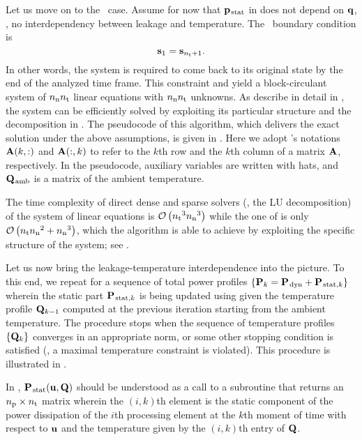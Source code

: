 Let us move on to the \DSS\ case.
Assume for now that $\mathbf{p}_{\text{\kern0.1emstat}}$ in  does not depend on $\mathbf{q}$, \ie, no interdependency between leakage and temperature.
The \DSS\ boundary condition is
\[
  \mathbf{s}_1 = \mathbf{s}_{{n_\text{t}} + 1}.
\]
In other words, the system is required to come back to its original state by the end of the analyzed time frame.
This constraint and  yield a block-circulant system of ${n_\text{n}} {n_\text{t}}$ linear equations with ${n_\text{n}} {n_\text{t}}$ unknowns.
As describe in detail in \cite{ukhov2012}, the system can be efficiently solved by exploiting its particular structure and the decomposition in .
The pseudocode of this algorithm, which delivers the exact solution under the above assumptions, is given in .
Here we adopt 's \cite{matlab} notations $\mathbf{A}(k, :)$ and $\mathbf{A}(:, k)$ to refer to the $k$th row and the $k$th column of a matrix $\mathbf{A}$, respectively.
In the pseudocode, auxiliary variables are written with hats, and $\mathbf{Q}_{\text{\kern0.1emamb}}$ is a matrix of the ambient temperature.

\begin{remark}
The time complexity of  direct dense and sparse solvers (\eg, the LU decomposition) of the system of linear equations is $\mathcal{O}\left( {n_\text{t}}^3 {n_\text{n}}^3 \right)$ while the one of  is only $\mathcal{O}\left( {n_\text{t}} {n_\text{n}}^2 + {n_\text{n}}^3 \right)$, which the algorithm is able to achieve by exploiting the specific structure of the system; see \cite{ukhov2012}.
\end{remark}

Let us now bring the leakage-temperature interdependence into the picture.
To this end, we repeat  for a sequence of total power profiles $\{ \mathbf{P}_k = \mathbf{P}_{\text{\kern0.1emdyn}} + \mathbf{P}_{\text{\kern0.1emstat}, k} \}$ wherein the static part $\mathbf{P}_{\text{\kern0.1emstat}, k}$ is being updated using  given the temperature profile $\mathbf{Q}_{k - 1}$ computed at the previous iteration starting from the ambient temperature.
The procedure stops when the sequence of temperature profiles $\{ \mathbf{Q}_k \}$ converges in an appropriate norm, or some other stopping condition is satisfied (\eg, a maximal temperature constraint is violated).
This procedure is illustrated in .


In , $\mathbf{P}_{\text{\kern0.1emstat}}(\mathbf{u}, \mathbf{Q})$ should be understood as a call to a subroutine that returns an ${n_\text{p}} \times {n_\text{t}}$ matrix wherein the $(i, k)$th element is the static component of the power dissipation of the $i$th processing element at the $k$th moment of time with respect to $\mathbf{u}$ and the temperature given by the $(i, k)$th entry of $\mathbf{Q}$.

